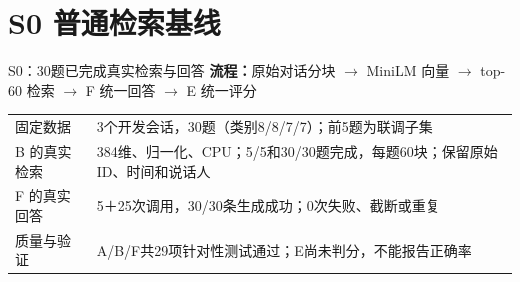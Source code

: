 \section{S0 普通检索基线}
\begin{frame}{S0：30题已完成真实检索与回答}
\small
\textbf{流程：}原始对话分块 $\rightarrow$ MiniLM 向量 $\rightarrow$
top-60 检索 $\rightarrow$ F 统一回答 $\rightarrow$ E 统一评分
\par\vspace{3mm}
\begin{tabularx}{\linewidth}{@{}p{33mm}Y@{}}
\toprule
固定数据 & 3个开发会话，30题（类别8/8/7/7）；前5题为联调子集\\[1mm]
B 的真实检索 & 384维、归一化、CPU；5/5和30/30题完成，每题60块；保留原始ID、时间和说话人\\[1mm]
F 的真实回答 & 5＋25次调用，30/30条生成成功；0次失败、截断或重复\\[1mm]
质量与验证 & A/B/F共29项针对性测试通过；E尚未判分，不能报告正确率\\\bottomrule
\end{tabularx}
\end{frame}


